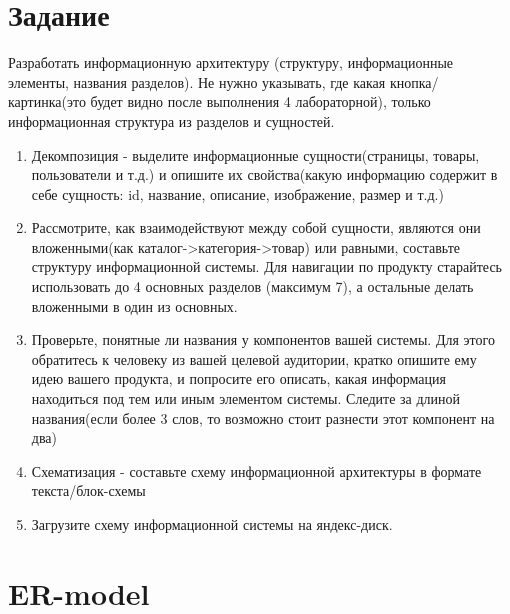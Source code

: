 \documentclass[12pt]{report}
\begin{document}
	\section*{Задание}
	Разработать информационную архитектуру (структуру, информационные элементы, названия разделов). Не нужно указывать, где какая кнопка/картинка(это будет видно после выполнения 4 лабораторной), только информационная структура из разделов и сущностей.
	\begin{enumerate}
		\item Декомпозиция - выделите информационные сущности(страницы, товары, пользователи и т.д.) и опишите их свойства(какую информацию содержит в себе сущность: id, название, описание, изображение, размер и т.д.) \\
		
		\item Рассмотрите, как взаимодействуют между собой сущности, являются они вложенными(как каталог->категория->товар) или равными, составьте структуру информационной системы. Для навигации по продукту старайтесь использовать до 4 основных разделов (максимум 7), а остальные делать вложенными в один из основных. \\
		
		\item Проверьте, понятные ли названия у компонентов вашей системы. Для этого обратитесь к человеку из вашей целевой аудитории, кратко опишите ему идею вашего продукта, и попросите его описать, какая информация находиться под тем или иным элементом системы. Следите за длиной названия(если более 3 слов, то возможно стоит разнести этот компонент на два) \\
		
		\item Схематизация - составьте схему информационной архитектуры в формате текста/блок-схемы \\
		
		\item Загрузите схему информационной системы на яндекс-диск. \\
	\end{enumerate}
	\newpage
	
	\section*{ER-model}
	
\end{document}
